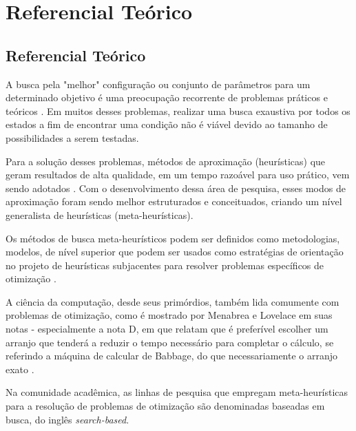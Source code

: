 \part{Referencial Teórico}

\chapter[Referencial Teórico]{Referencial Teórico}

A busca pela "melhor" configuração ou conjunto de parâmetros para um determinado objetivo é uma preocupação recorrente de problemas práticos e teóricos \cite{combinatorialoptimization1998}. Em muitos desses problemas, realizar uma busca exaustiva por todos os estados a fim de encontrar uma condição não é viável devido ao tamanho de possibilidades a serem testadas. 

Para a solução desses problemas, métodos de aproximação (heurísticas) que geram resultados de alta qualidade, em um tempo razoável para uso prático, vem sendo adotados \cite{gendreau2005metaheuristics}. Com o desenvolvimento dessa área de pesquisa, esses modos de aproximação foram sendo melhor estruturados e conceituados, criando um nível generalista de heurísticas (meta-heurísticas).

Os métodos de busca meta-heurísticos podem ser definidos como metodologias, modelos, de nível superior que podem ser usados como estratégias de orientação no projeto de heurísticas subjacentes para resolver problemas específicos de otimização \cite{talbi2009metaheuristics}.

A ciência da computação, desde seus primórdios, também lida comumente com problemas de otimização, como é mostrado por Menabrea e Lovelace em suas notas - especialmente a nota D, em que relatam que é preferível escolher um arranjo que tenderá a reduzir o tempo necessário para completar o cálculo, se referindo a máquina de calcular de Babbage, do que necessariamente o arranjo exato \cite{menabrea1842sketch}.

Na comunidade acadêmica, as linhas de pesquisa que empregam meta-heurísticas para a resolução de problemas de otimização são denominadas baseadas em busca, do inglês \textit{search-based}.

